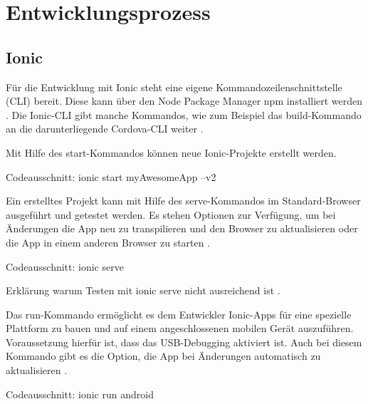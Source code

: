 \chapter{Entwicklungsprozess}
\label{Entwicklungsprozess}

\section{Ionic}
\label{Ionic}
Für die Entwicklung mit Ionic steht eine eigene Kommandozeilenschnittstelle (CLI) bereit. Diese kann über den Node Package Manager npm installiert werden \cite{ionic:cli}. Die Ionic-CLI gibt manche Kommandos, wie zum Beispiel das build-Kommando an die darunterliegende Cordova-CLI weiter \cite{ionic:build}.

Mit Hilfe des start-Kommandos können neue Ionic-Projekte erstellt werden.

Codeausschnitt: ionic start myAwesomeApp --v2 \cite{ionic:cli}

Ein erstelltes Projekt kann mit Hilfe des serve-Kommandos im Standard-Browser ausgeführt und getestet werden. Es stehen Optionen zur Verfügung, um bei Änderungen die App neu zu transpilieren und den Browser zu aktualisieren oder die App in einem anderen Browser zu starten \cite{ionic:serve}.

Codeausschnitt: ionic serve \cite{ionic:cli}

Erklärung warum Testen mit ionic serve nicht ausreichend ist \cite{raboy:serve}.

Das run-Kommando ermöglicht es dem Entwickler Ionic-Apps für eine spezielle Plattform zu bauen und auf einem angeschlossenen mobilen Gerät auszuführen. Voraussetzung hierfür ist, dass das USB-Debugging aktiviert ist. Auch bei diesem Kommando gibt es die Option, die App bei Änderungen automatisch zu aktualisieren \cite{ionic:run}.

Codeausschnitt: ionic run android \cite{ionic:run}
